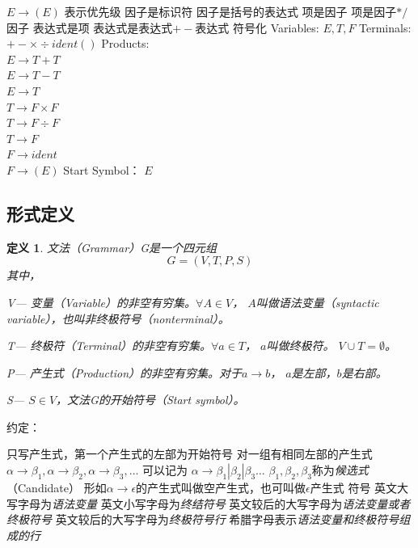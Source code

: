 \documentclass{ctexart}
\newtheorem{definition}{定义}[section]
\begin{document}
\begin{outline}
               $E \to (E)$
        \2 表示优先级
            \3 因子是标识符
            \3 因子是括号的表达式
            \3 项是因子
            \3 项是因子$*/$因子
            \3 表达式是项
            \3 表达式是表达式$+-$表达式
        \2 符号化 
            \3 Variables: $E, T, F$
            \3 Terminals: $+ - \times \div ident ( )$
            \3 Products:  \\
                $E \to T + T$ \\
                $E \to T - T$ \\
                $E \to T$ \\
                $T \to F \times F$ \\
                $T \to F \div F$ \\
                $T \to F $ \\
                $F \to ident$ \\
                $F \to (E)$
            \3 Start Symbol： $E$
\end{outline}
\subsection{形式定义}
\begin{definition}
    文法（Grammar）G是一个四元组
    $$
        G = (V, T, P, S)
    $$
    其中，

    V--- \emph{变量（Variable）}的非空有穷集。$\forall A \in V$，
    $A$叫做语法变量（syntactic variable），也叫非终极符号（nonterminal）。
    
    T--- \emph{终极符（Terminal）}的非空有穷集。$\forall a \in T$，
    $a$叫做终极符。 $V \cup T = \emptyset$。

    P--- \emph{产生式（Production）}的非空有穷集。对于$a \to b$，
    $a$是\emph{左部}，$b$是\emph{右部}。

    S--- $S \in V$，文法G的\emph{开始符号（Start symbol）}。
\end{definition}

约定：
\begin{outline}
    \1 只写产生式，第一个产生式的左部为开始符号
    \1 对一组有相同左部的产生式 \\
        $\alpha \to \beta_1, \alpha \to \beta_2, \alpha \to \beta_3, \dots$
        可以记为 $\alpha \to \beta_1 | \beta_2 | \beta_3 \dots$
        $\beta_1 , \beta_2 , \beta_3$称为\emph{候选式}（Candidate）
    \1 形如$\alpha \to \epsilon$的产生式叫做空产生式，也可叫做$\epsilon$产生式
    \1 符号
        \2 英文大写字母为\emph{语法变量}
        \2 英文小写字母为\emph{终结符号}
        \2 英文较后的大写字母为\emph{语法变量或者终极符号}
        \2 英文较后的大写字母为\emph{终极符号行}
        \2 希腊字母表示\emph{语法变量和终极符号组成的行}
\end{outline}
\end{document}
